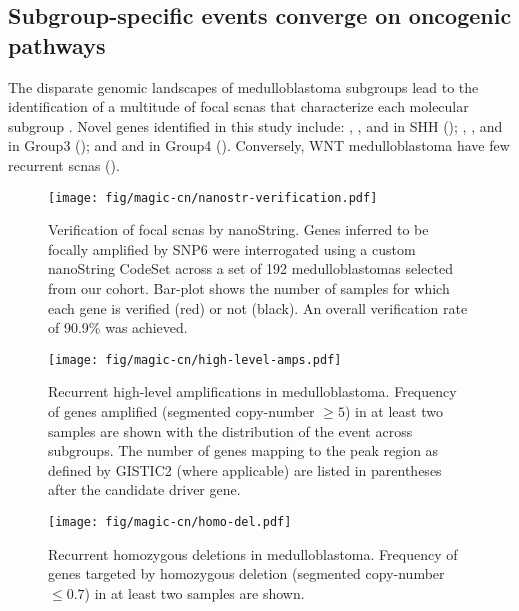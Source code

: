 \subsection{Subgroup-specific events converge on oncogenic pathways}

The disparate genomic landscapes of medulloblastoma subgroups lead to the identification of a multitude of focal \gls{scnas} that characterize each molecular subgroup . Novel genes identified in this study include: , , and  in SHH (); , , and  in Group3 (); and  and  in Group4 (). Conversely, WNT medulloblastoma have few recurrent \gls{scnas} (). 

\begin{SCfigure}[5]
	\centering
	\texttt{[image: fig/magic-cn/nanostr-verification.pdf]}
	\caption[Verification of focal \gls{scnas} by nanoString]
	{
	Verification of focal \gls{scnas} by nanoString.
	Genes inferred to be focally amplified by SNP6 were interrogated using a custom nanoString CodeSet across a set of 192 medulloblastomas selected from our cohort. Bar-plot shows the number of samples for which each gene is verified (red) or not (black). An overall verification rate of 90.9\% was achieved.
	}
	\label{fig:nanostr-verification}
\end{SCfigure}

\clearpage

\begin{figure}[5]
	\centering
	\texttt{[image: fig/magic-cn/high-level-amps.pdf]}
	\caption[Recurrent high-level amplifications in medulloblastoma]
	{
	Recurrent high-level amplifications in medulloblastoma.
	Frequency of genes amplified (segmented copy-number $\geq 5$) in at least two samples are shown with the distribution of the event across subgroups. The number of genes mapping to the peak region as defined by GISTIC2 (where applicable) are listed in parentheses after the candidate driver gene.
	}
	\label{fig:high-level-amps}
\end{figure}

\begin{figure}[5]
	\centering
	\texttt{[image: fig/magic-cn/homo-del.pdf]}
	\caption[Recurrent homozygous deletions in medulloblastoma]
	{
	Recurrent homozygous deletions in medulloblastoma.
	Frequency of genes targeted by homozygous deletion (segmented copy-number $\leq 0.7$) in at least two samples are shown.
	}
	\label{fig:homo-del}
\end{figure}

